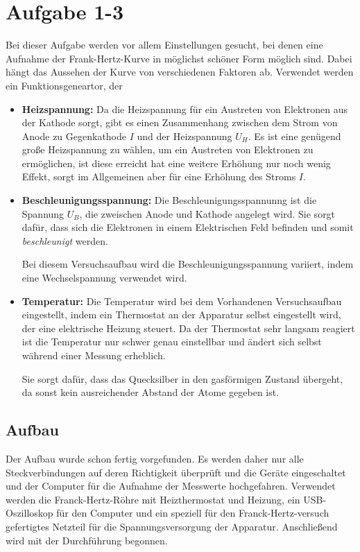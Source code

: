 \section{Aufgabe 1-3}
Bei dieser Aufgabe werden vor allem Einstellungen gesucht, bei denen eine Aufnahme der Frank-Hertz-Kurve in möglichst schöner Form möglich sind. Dabei hängt das Aussehen der Kurve von verschiedenen Faktoren ab. Verwendet werden ein Funktionsgeneartor, der 
\begin{itemize}
\item[] \textbf{Heizspannung:} Da die Heizspannung für ein Austreten von Elektronen aus der Kathode sorgt, gibt es einen Zusammenhang zwischen dem Strom von Anode zu Gegenkathode \(I\) und der Heizspannung \(U_H\). Es ist eine genügend große Heizspannung zu wählen, um ein Austreten von Elektronen zu ermöglichen, ist diese erreicht hat eine weitere Erhöhung nur noch wenig Effekt, sorgt im Allgemeinen aber für eine Erhöhung des Stroms \(I\).
\item[] \textbf{Beschleunigungsspannung:} Die Beschleunigungsspannunng ist die Spannung \(U_B\), die zweischen Anode und Kathode angelegt wird. Sie sorgt dafür, dass sich die Elektronen in einem Elektrischen Feld befinden und somit \textit{beschleunigt} werden.

Bei diesem Versuchsaufbau wird die Beschleunigungsspannung variiert, indem eine Wechselspannung verwendet wird.
\item[] \textbf{Temperatur:} Die Temperatur wird bei dem Vorhandenen Versuchsaufbau eingestellt, indem ein Thermostat an der Apparatur selbst eingestellt wird, der eine elektrische Heizung steuert. Da der Thermostat sehr langsam reagiert ist die Temperatur nur schwer genau einstellbar und ändert sich selbst während einer Messung erheblich.

Sie sorgt dafür, dass das Quecksilber in den gasförmigen Zustand übergeht, da sonst kein ausreichender Abstand der Atome gegeben ist.
\end{itemize}
\subsection{Aufbau}
Der Aufbau wurde schon fertig vorgefunden. Es werden daher nur alle Steckverbindungen auf deren Richtigkeit überprüft und die Geräte eingeschaltet und der Computer für die Aufnahme der Messwerte hochgefahren. Verwendet werden die Franck-Hertz-Röhre mit Heizthermostat und Heizung, ein USB-Oszilloskop für den Computer und ein speziell für den Franck-Hertz-versuch gefertigtes Netzteil für die Spannungsversorgung der Apparatur. Anschließend wird mit der Durchführung begonnen.
